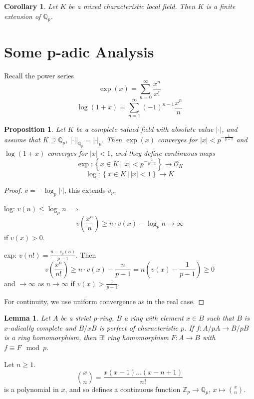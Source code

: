 \documentclass[a4paper]{article}
\newtheorem{lemma}[definition]{Lemma}
\newtheorem{prop}[definition]{Proposition}
\newtheorem{corollary}[definition]{Corollary}
\newcommand*\abs[1]{\left|#1\right|}
\begin{document}
\begin{corollary}
	Let $K$ be a mixed characteristic local field.
	Then $K$ is a finite extension of $\mathbb{Q}_p$.
\end{corollary}

\section{Some p-adic Analysis}

Recall the power series
$$\exp(x) = \sum_{n=0}^\infty \frac{x^n}{x!}$$
$$\log(1+x) = \sum_{n=1}^\infty (-1)^{n-1} \frac{x^n}{n}$$

\begin{prop}
	Let $K$ be a complete valued field with absolute value $\abs{\cdot}$,
	and assume that $K \supseteq \mathbb{Q}_p$,
	$\abs{\cdot}|_{\mathbb{Q}_p} = \abs{\cdot}_p$.
	Then $\exp(x)$ converges for $\abs{x} < p^{-\frac{1}{p-1}}$ and $\log(1+x)$ converges for $\abs{x}<1$,
	and they define continuous maps
	$$\exp :\left\{x \in K \,|\, \abs{x} < p^{-\frac{1}{p-1}}\right\} \to \mathcal{O}_K$$
	$$\log: \left\{x \in K \,|\, \abs{x} < 1 \right\} \to K$$
\end{prop}
\begin{proof}
	$v=-\log_p\abs{\cdot}$, this extends $v_p$.
	
	log: $v(n) \leq \log_p n \implies$
	$$v(\frac{x^n}{n}) \geq n \cdot v(x) - \log_p n \to \infty$$
	if $v(x) > 0$.
	
	exp: $v(n!) = \frac{n-s_p(n)}{p-1}$.
	Then
	$$v(\frac{x^n}{n!}) \geq n\cdot v(x) - \frac{n}{p-1} = n(v(x)-\frac{1}{p-1}) \geq 0$$
	and $\to \infty$ as $n \to \infty$ if $v(x) > \frac{1}{p-1}$.
	
	For continuity, we use uniform convergence as in the real case.
\end{proof}

\setcounter{definition}{52}
\renewcommand{\thedefinition}{\arabic{definition}''}
\begin{lemma}
	Let $A$ be a strict $p$-ring,
	$B$ a ring with element $x \in B$ such that $B$ is $x$-adically complete and $B/xB$ is perfect of characteristic $p$.
	If $f: A/pA \to B/pB$ is a ring homomorphism,
	then $\exists!$ ring homomorphism $F:A \to B$ with $f \equiv F \mod p$.
\end{lemma}
\setcounter{definition}{60}
\renewcommand{\thedefinition}{\arabic{definition}}

Let $n\geq 1$.
$${x \choose n} = \frac{x(x-1)\dots(x-n+1)}{n!}$$
is a polynomial in $x$, and so defines a continuous function $\mathbb{Z}_p \to \mathbb{Q}_p$,
$x \mapsto {x \choose n}$.
\end{document}
